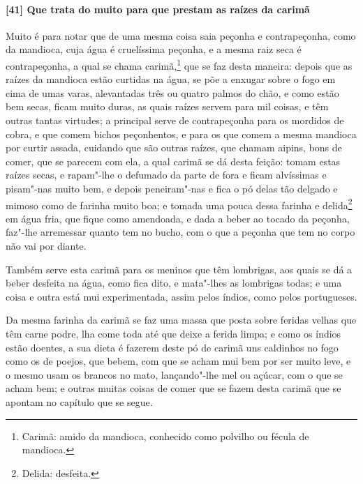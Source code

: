 \begin{linenumbers}
\paragraph{[41] Que trata do muito para que prestam as raízes da carimã}\quad
Muito é para notar que de uma mesma coisa saia peçonha e contrapeçonha, como da mandioca,
cuja água é cruelíssima peçonha, e a mesma raiz seca é contrapeçonha, a qual se chama
carimã,\footnote{ Carimã: amido da mandioca, conhecido como polvilho ou fécula de
mandioca.} que se faz desta maneira: depois que as raízes da mandioca estão curtidas na
água, se põe a enxugar sobre o fogo em cima de umas varas, alevantadas três ou quatro
palmos do chão, e como estão bem secas, ficam muito duras, as quais raízes servem para mil
coisas, e têm outras tantas virtudes; a principal serve de contrapeçonha para os mordidos
de cobra, e que comem bichos peçonhentos, e para os que comem a mesma mandioca por curtir
assada, cuidando que são outras raízes, que chamam aipins, bons de comer, que se parecem
com ela, a qual carimã se dá desta feição: tomam estas raízes secas, e rapam"-lhe o
defumado da parte de fora e ficam alvíssimas e pisam"-nas muito bem, e depois peneiram"-nas
e fica o pó delas tão delgado e mimoso como de farinha muito boa; e tomada uma pouca dessa
farinha e delida\footnote{ Delida: desfeita.} em água fria, que fique como 
amendoada, e dada a beber ao tocado da peçonha, faz"-lhe arremessar quanto tem no bucho,
com o que a peçonha que tem no corpo não vai por diante.

Também serve esta carimã para os meninos que têm lombrigas, aos quais se dá a beber
desfeita na água, como fica dito, e mata"-lhes as lombrigas todas; e uma coisa e outra está
mui experimentada, assim pelos índios, como pelos portugueses.

Da mesma farinha da carimã se faz uma massa que posta sobre feridas velhas que têm carne
podre, lha come toda até que deixe a ferida limpa; e como os índios estão doentes, a sua
dieta é fazerem deste pó de carimã uns caldinhos no fogo como os de poejos, que bebem, com
que se acham mui bem por ser muito leve, e o mesmo usam os brancos no mato, lançando"-lhe
mel ou açúcar, com o que se acham bem; e outras muitas coisas de comer que se fazem desta
carimã que se apontam no capítulo que se segue.


\end{linenumbers}
